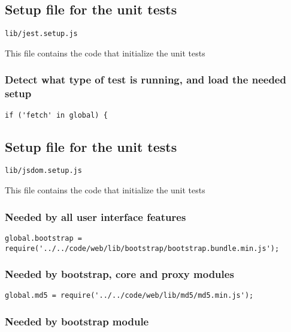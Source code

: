 \documentclass[a4paper]{article}
\begin{document}
\subsection{Setup file for the unit tests}

\begin{lstlisting}
lib/jest.setup.js
\end{lstlisting}

This file contains the code that initialize the unit tests

\hypertarget{toc440}{}
\subsubsection{Detect what type of test is running, and load the needed setup}

\begin{lstlisting}
if ('fetch' in global) {
\end{lstlisting}

\hypertarget{toc441}{}
\subsection{Setup file for the unit tests}

\begin{lstlisting}
lib/jsdom.setup.js
\end{lstlisting}

This file contains the code that initialize the unit tests

\hypertarget{toc442}{}
\subsubsection{Needed by all user interface features}

\begin{lstlisting}
global.bootstrap = require('../../code/web/lib/bootstrap/bootstrap.bundle.min.js');
\end{lstlisting}

\hypertarget{toc443}{}
\subsubsection{Needed by bootstrap, core and proxy modules}

\begin{lstlisting}
global.md5 = require('../../code/web/lib/md5/md5.min.js');
\end{lstlisting}

\hypertarget{toc444}{}
\subsubsection{Needed by bootstrap module}
\end{document}

